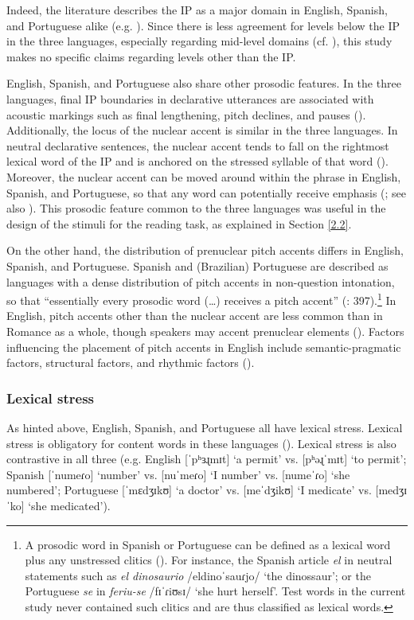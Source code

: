 \documentclass[output=paper]{langscibook}
\begin{document}
Indeed, the literature describes the IP as a major domain in English, Spanish, and Portuguese alike (e.g. \citealt{bp86, pvh95, f00}). Since there is less agreement for levels below the IP in the three languages, especially regarding mid-level domains (cf. \citealt{st96, fp15}), this study makes no specific claims regarding levels other than the IP.

English, Spanish, and Portuguese also share other prosodic features. In the three languages, final IP boundaries in declarative utterances are associated with acoustic markings such as final lengthening, pitch declines, and pauses (\citealt{bp86, pvh95, f00}). Additionally, the locus of the nuclear accent is similar in the three languages. In neutral declarative sentences, the nuclear accent tends to fall on the rightmost lexical word of the IP and is anchored on the stressed syllable of that word (\citealt{p80, hp15, fm16}). Moreover, the nuclear accent can be moved around within the phrase in English, Spanish, and Portuguese, so that any word can potentially receive emphasis (\citealt{be94, l08, fp15, fm16}; see also \citealt{vag18}). This prosodic feature common to the three languages was useful in the design of the stimuli for the reading task, as explained in Section \ref{2.2}.

On the other hand, the distribution of prenuclear pitch accents differs in English, Spanish, and Portuguese. Spanish and (Brazilian) Portuguese are described as languages with a dense distribution of pitch accents in non-question intonation, so that “essentially every prosodic word (…) receives a pitch accent” (\cite{fp15}: 397).\footnote{A prosodic word in Spanish or Portuguese can be defined as a lexical word plus any unstressed clitics (\citealt{h07, v11}). For instance, the Spanish article \textit{el} in neutral statements such as \textit{el dinosaurio} /eldinoˈsauɾjo/ ‘the dinossaur’; or the Portuguese \textit{se} in \textit{feriu-se} /fɪˈɾiʊsɪ/ ‘she hurt herself’. Test words in the current study never contained such clitics and are thus classified as lexical words.} In English, pitch accents other than the nuclear accent are less common than in Romance as a whole, though speakers may accent prenuclear elements (\citealt{l08}). Factors influencing the placement of pitch accents in English include semantic-pragmatic factors, structural factors, and rhythmic factors (\citealt{st96}).

\subsubsection{Lexical stress}
As hinted above, English, Spanish, and Portuguese all have lexical stress. Lexical stress is obligatory for content words in these languages (\citealt{lp77, h12, md00}). Lexical stress is also contrastive in all three (e.g. English [ˈpʰɜɻmɪt] ‘a permit’ vs. [pʰəɻˈmɪt] ‘to permit’; Spanish [ˈnumeɾo] ‘number’ vs. [nuˈmeɾo] ‘I number’ vs. [numeˈɾo] ‘she numbered’; Portuguese [ˈmɛdʒɪkʊ] ‘a doctor’ vs. [meˈdʒikʊ] ‘I medicate’ vs. [medʒɪˈko] ‘she medicated’).
\end{document}
